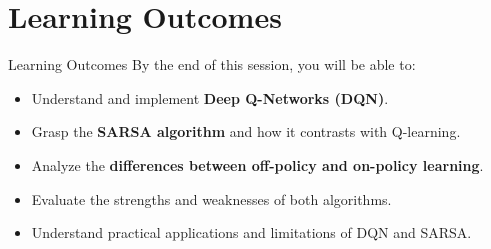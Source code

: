 \section{Learning Outcomes}
\begin{frame}{Learning Outcomes}
    \large
    By the end of this session, you will be able to:
    \vspace{0.5em}
    \begin{itemize}
        \item Understand and implement \textbf{Deep Q-Networks (DQN)}.
        \item Grasp the \textbf{SARSA algorithm} and how it contrasts with Q-learning.
        \item Analyze the \textbf{differences between off-policy and on-policy learning}.
        \item Evaluate the strengths and weaknesses of both algorithms.
        \item Understand practical applications and limitations of DQN and SARSA.
    \end{itemize}
\end{frame}